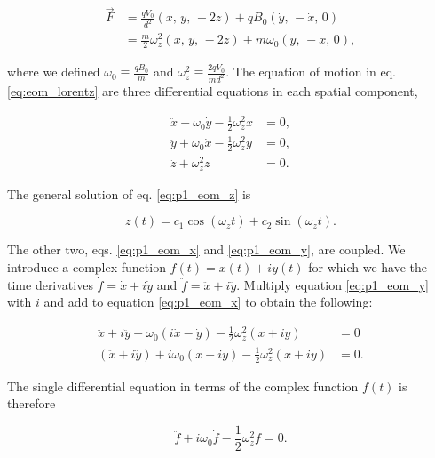 \begin{equation} \label{eq:p1_lorentz_force_penning}
    \begin{split}
        \vec{F} &= \frac{q V_0}{d^2}(x,\,y,\,-2z) + q B_0 (\dot{y},\,-\dot{x},\,0) \\
        &= \frac{m}{2}\omega_z^2 (x,\,y,\,-2z) + m \omega_0 (\dot{y},\,-\dot{x},\,0),
    \end{split}
\end{equation} 

where we defined $\omega_0 \equiv \frac{qB_0}{m}$ and $\omega_z^2 \equiv \frac{2qV_0}{m d^2}$. The equation of motion in eq. \eqref{eq:eom_lorentz} are three differential equations in each spatial component,

\begin{align}
    \ddot{x} - \omega_0 \dot{y} - \frac{1}{2} \omega_z^2 x &= 0, \label{eq:p1_eom_x} \\ 
    \ddot{y} + \omega_0 \dot{x} - \frac{1}{2} \omega_z^2 y &= 0, \label{eq:p1_eom_y} \\ 
    \ddot{z} + \omega_z^2 z &= 0. \label{eq:p1_eom_z}
\end{align}

The general solution of eq. \eqref{eq:p1_eom_z} is

\begin{equation}
    z(t) = c_1 \cos(\omega_z t) + c_2 \sin(\omega_z t). \label{eq:p1_diffeq_solution_z}
\end{equation}

The other two, eqs. \eqref{eq:p1_eom_x} and \eqref{eq:p1_eom_y}, are coupled. We introduce a complex function $f(t)=x(t) + iy(t)$ for which we have the time derivatives $\dot{f} = \dot{x} + i\dot{y}$ and $\ddot{f} = \ddot{x} + i\ddot{y}$. Multiply equation \eqref{eq:p1_eom_y} with $i$ and add to equation \eqref{eq:p1_eom_x} to obtain the following:

\begin{equation}\label{eq:p2_eom_rewritten}
    \begin{split}
    \ddot{x} + i\ddot{y} + \omega_0(i\dot{x} - \dot{y}) -\frac{1}{2}\omega_z^2(x+iy) &= 0 \\
    (\ddot{x} + i\ddot{y}) + i\omega_0(\dot{x} +i \dot{y}) -\frac{1}{2}\omega_z^2(x+iy) &= 0. 
    \end{split}
\end{equation}

The single differential equation in terms of the complex function $f(t)$ is therefore

\begin{equation}
    \ddot{f} + i\omega_0 \dot{f} - \frac{1}{2}\omega_z^2 f = 0. \label{eq:p2_f_complex_equation}
\end{equation}

